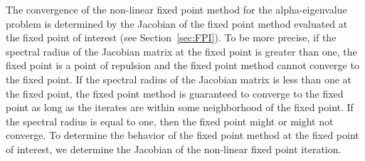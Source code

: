 The convergence of the non-linear fixed point method for the alpha-eigenvalue problem is determined by the Jacobian of the fixed point method evaluated at the fixed point of interest (see Section~\ref{sec:FPI}). To be more precise, if the spectral radius of the Jacobian matrix at the fixed point is greater than one, the fixed point is a point of repulsion and the fixed point method cannot converge to the fixed point. If the spectral radius of the Jacobian matrix is less than one at the fixed point, the fixed point method is guaranteed to converge to the fixed point as long as the iterates are within some neighborhood of the fixed point. If the spectral radius is equal to one, then the fixed point might or might not converge. To determine the behavior of the fixed point method at the fixed point of interest, we determine the Jacobian of the non-linear fixed point iteration.

